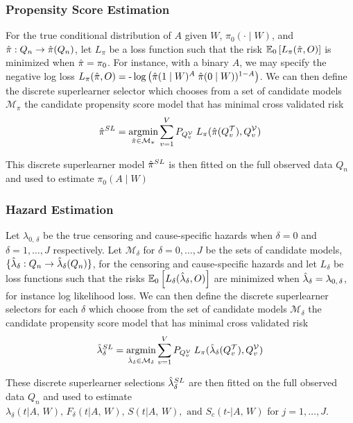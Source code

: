 \documentclass{report}
\DeclareMathOperator*{\argmin}{argmin}
\newcommand{\1}{\ensuremath{\mathbf{1}}}
\newcommand{\X}{\ensuremath{{W}}}
\newcommand{\AX}{\ensuremath{\mid A,\,{W}}}
\newcommand{\g}{\ensuremath{\pi}}
\begin{document}
\subsubsection{Propensity Score Estimation}
\label{sec:org6fd99a6}
For the true conditional distribution of \(A\) given \(\X\), \(\g_0(\cdot \mid \X)\), and \(\Hat{\g} : Q_n \to \Hat{\g}(Q_n)\), let \(L_\g\) be a loss function such that the risk \(\mathbb{E}_0\left[L_\g(\Hat{\g}, O)\right]\) is minimized when \(\Hat{\g} = \g_0\). For instance, with a binary \(A\), we may specify the negative log loss \(L_\g(\Hat{\g}, O) = \text{-}\log\left(\Hat{\g}(1 \mid \X)^A \; \Hat{\g}(0 \mid \X))^{1-A}\right)\). We can then define the discrete superlearner selector which chooses from a set of candidate models \(\mathcal{M_\g}\) the candidate propensity score model that has minimal cross validated risk 
\[ \Hat{\g}^{SL} = \argmin_{\Hat{\g} \in \mathcal{M}_\g} \sum_{v = 1}^{V} P_{Q^\mathcal{V}_v} \; L_\g(\Hat{\g}(Q^\mathcal{T}_v), Q^\mathcal{V}_v)\]

This discrete superlearner model \(\Hat{\g}^{SL}\) is then fitted on the full observed data \(Q_n\) and used to estimate \(\g_0(A \mid \X)\)

\subsubsection{Hazard Estimation}
\label{sec:org4425338}
Let \(\lambda_{0,\,\delta}\) be the true censoring and cause-specific hazards when \(\delta = 0\) and \(\delta = 1, \dots, J\) respectively. Let \(\mathcal{M}_\delta\) for \(\delta = 0, \dots, J\) be the sets of candidate models, \(\{\Hat{\lambda}_\delta : Q_n \to \Hat{\lambda}_\delta(Q_n)\}\), for the censoring and cause-specific hazards and let \(L_\delta\) be loss functions such that the risks \(\mathbb{E}_0\left[L_\delta(\Hat{\lambda}_\delta, O)\right]\) are minimized when \(\Hat{\lambda}_\delta = \lambda_{0,\,\delta}\), for instance log likelihood loss. We can then define the discrete superlearner selectors for each \(\delta\) which choose from the set of candidate models \(\mathcal{M_\delta}\) the candidate propensity score model that has minimal cross validated risk 
\[ \Hat{\lambda}_\delta^{SL} = \argmin_{\Hat{\lambda}_\delta \in \mathcal{M}_\delta} \sum_{v = 1}^{V} P_{Q^\mathcal{V}_v} \; L_\g(\Hat{\lambda}_\delta(Q^\mathcal{T}_v), Q^\mathcal{V}_v)\]

These discrete superlearner selections \(\Hat{\lambda}_\delta^{SL}\) are then fitted on the full observed data \(Q_n\) and used to estimate \(\lambda_\delta(t \AX), \, F_\delta(t \AX),\, S(t \AX), \text{ and } S_c(t\text{-} \AX)\) for \(j = 1,\dots, J\).
\end{document}
